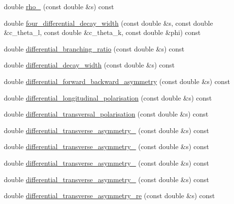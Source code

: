 \begin{DoxyCompactItemize}
\item 
double \hyperlink{classeos_1_1BToKstarDilepton_3_01LowRecoil_01_4_a358c56df174296e11561ab993f5f1b95}{rho\_} (const double \&s) const 
\item 
double \hyperlink{classeos_1_1BToKstarDilepton_3_01LowRecoil_01_4_a7e9d0b8473b5b1bcf0bad5b9454dde4a}{four\_\-differential\_\-decay\_\-width} (const double \&s, const double \&c\_\-theta\_\-l, const double \&c\_\-theta\_\-k, const double \&phi) const 
\item 
double \hyperlink{classeos_1_1BToKstarDilepton_3_01LowRecoil_01_4_a668814b8c9d2801119d7a9e9d5a6cef2}{differential\_\-branching\_\-ratio} (const double \&s) const 
\item 
double \hyperlink{classeos_1_1BToKstarDilepton_3_01LowRecoil_01_4_a7c6809651a8393f33f7902d75c5caf06}{differential\_\-decay\_\-width} (const double \&s) const 
\item 
double \hyperlink{classeos_1_1BToKstarDilepton_3_01LowRecoil_01_4_a89d6055877d908f6935a684ed9da10c4}{differential\_\-forward\_\-backward\_\-asymmetry} (const double \&s) const 
\item 
double \hyperlink{classeos_1_1BToKstarDilepton_3_01LowRecoil_01_4_ac7058d6f6fd6f66bf4737f10b7194d97}{differential\_\-longitudinal\_\-polarisation} (const double \&s) const 
\item 
double \hyperlink{classeos_1_1BToKstarDilepton_3_01LowRecoil_01_4_aef1eb2533f6a2ed2282cd0ec3c814db3}{differential\_\-transversal\_\-polarisation} (const double \&s) const 
\item 
double \hyperlink{classeos_1_1BToKstarDilepton_3_01LowRecoil_01_4_a51d0d5e2344f63369661b4ab29be71c0}{differential\_\-transverse\_\-asymmetry\_} (const double \&s) const 
\item 
double \hyperlink{classeos_1_1BToKstarDilepton_3_01LowRecoil_01_4_aa82e771aac95d62ddab87ade56558f13}{differential\_\-transverse\_\-asymmetry\_} (const double \&s) const 
\item 
double \hyperlink{classeos_1_1BToKstarDilepton_3_01LowRecoil_01_4_ae4bf258f37c1015a9cfce652ab8cd618}{differential\_\-transverse\_\-asymmetry\_} (const double \&s) const 
\item 
double \hyperlink{classeos_1_1BToKstarDilepton_3_01LowRecoil_01_4_ae6cce09b67d80f2cbc5bcc52673521f9}{differential\_\-transverse\_\-asymmetry\_} (const double \&s) const 
\item 
double \hyperlink{classeos_1_1BToKstarDilepton_3_01LowRecoil_01_4_adae1d33fab547d33c5dbd9b218cd3d56}{differential\_\-transverse\_\-asymmetry\_\-re} (const double \&s) const 

\end{DoxyCompactItemize}
